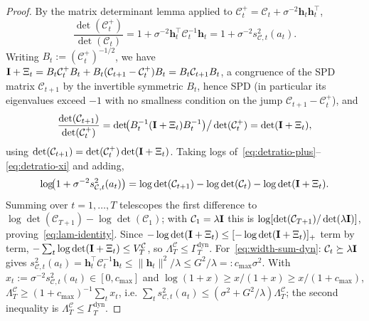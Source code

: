 \documentclass[twoside]{article}
\newcommand{\bh}{\mathbf{h}}                     %
\newcommand{\Calg}{\mathcal{C}}                 %
\newcommand{\Lamalg}{\Lambda^{\Calg}}           %
\newcommand{\Valg}{V^{\Calg}}                   %
\newcommand{\Gamdyn}{\Gamma^{\mathrm{dyn}}}     %
\begin{document}
\begin{proof}
By the matrix determinant lemma applied to
$\Calg_t^{+}=\Calg_t+\sigma^{-2}\bh_t\bh_t^\top$,
\begin{equation}\label{eq:detratio-plus}
  \frac{\det(\Calg_t^{+})}{\det(\Calg_t)}
  = 1+\sigma^{-2}\bh_t^\top\Calg_t^{-1}\bh_t
  = 1+\sigma^{-2}s_{\Calg,t}^2(a_t).
\end{equation}
Writing $B_t:=(\Calg_t^{+})^{-1/2}$, we have
$\bI+\Xi_t=B_t\Calg_t^{+}B_t+B_t(\Calg_{t+1}-\Calg_t^{+})B_t
=B_t\Calg_{t+1}B_t$, a congruence of the SPD matrix $\Calg_{t+1}$ by the
invertible symmetric $B_t$, hence SPD (in particular its eigenvalues exceed
$-1$ with no smallness condition on the jump $\Calg_{t+1}-\Calg_t^{+}$), and
\begin{equation}\label{eq:detratio-xi}
  \frac{\det(\Calg_{t+1})}{\det(\Calg_t^{+})}
  = \det\!\bigl(B_t^{-1}(\bI+\Xi_t)B_t^{-1}\bigr)\big/\det(\Calg_t^{+})
  = \det(\bI+\Xi_t),
\end{equation}
using $\det(\Calg_{t+1})=\det(\Calg_t^{+})\det(\bI+\Xi_t)$.
Taking logs of~\eqref{eq:detratio-plus}--\eqref{eq:detratio-xi} and adding,
\[
  \log\!\bigl(1+\sigma^{-2}s_{\Calg,t}^2(a_t)\bigr)
  = \log\det(\Calg_{t+1}) - \log\det(\Calg_t) - \log\det(\bI+\Xi_t).
\]
Summing over $t=1,\dots,T$ telescopes the first difference to
$\log\det(\Calg_{T+1})-\log\det(\Calg_1)$; with $\Calg_1=\lambda\bI$ this is
$\log[\det(\Calg_{T+1})/\det(\lambda\bI)]$, proving~\eqref{eq:lam-identity}.
Since $-\log\det(\mathbf{I}+\Xi_t)\le[-\log\det(\mathbf{I}+\Xi_t)]_+$ term by term,
$-\sum_t\log\det(\bI+\Xi_t)\le\Valg_T$, so $\Lamalg_T\le\Gamdyn_T$.
For~\eqref{eq:width-sum-dyn}: $\Calg_t\succeq\lambda\bI$ gives
$s_{\Calg,t}^2(a_t)=\bh_t^\top\Calg_t^{-1}\bh_t\le\|\bh_t\|^2/\lambda\le
G^2/\lambda=:c_{\max}\sigma^2$.  With $x_t:=\sigma^{-2}s_{\Calg,t}^2(a_t)\in
[0,c_{\max}]$ and $\log(1+x)\ge x/(1+x)\ge x/(1+c_{\max})$,
$\Lamalg_T\ge(1+c_{\max})^{-1}\sum_t x_t$, i.e.
$\sum_t s_{\Calg,t}^2(a_t)\le(\sigma^2+G^2/\lambda)\Lamalg_T$; the second
inequality is $\Lamalg_T\le\Gamdyn_T$.
\end{proof}
\end{document}
